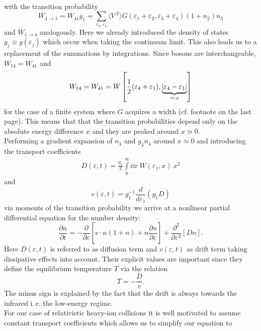 with the transition probability
\begin{equation}
W_{4\rightarrow 1}=  W_{41}g_1 = \sum_{\varepsilon_2, \varepsilon_3} \langle V^{\phantom{.}2}\rangle G(\varepsilon_1+\varepsilon_2,\varepsilon_3+\varepsilon_4)(1+n_2)n_3
\end{equation}
and $W_{1\rightarrow 4}$ analogously. Here we already introduced the density of states $g_j\equiv g(\varepsilon_j)$ which occur when taking the continuum limit. This also leads us to a replacement of the summations by integrations. Since bosons are interchangeable, $W_{14}=W_{41}$ and 
\begin{equation}
		W_{14}=W_{41}=W\left[\frac{1}{2}(\varepsilon_4+\varepsilon_1),\underbrace{\abs{\varepsilon_4-\varepsilon_1}}_{=: x}\right]
	\end{equation}
for the case of a finite system where $G$ acquires a width (cf. footnote on the last page). This means that that the transition probabilities depend only on the absolute energy difference $x$ and they are peaked around $x\simeq 0$.\\
\noindent
Performing a gradient expansion of $n_4$ and $g_4n_4$ around $x\simeq 0$ and introducing the transport coefficients
\begin{align}
	D(\varepsilon,t) = \frac{g_1}{2}\int\limits_0^{\infty}\dd x\ W(\varepsilon_1,x) \ x^2
\end{align}
and 
\begin{equation}
		v(\varepsilon,t) = g_1^{-1}\frac{d}{d\varepsilon_1}(g_1D) 
\end{equation}
via moments of the transition probability we arrive at a nonlinear partial differential equation for the number density:
\begin{equation}
			\frac{\partial n}{\partial t} = -\frac{\partial}{\partial\varepsilon}\left[v\cdot n(1+n) + n\frac{\partial n}{\partial\varepsilon}\right] + \frac{\partial^2}{\partial\varepsilon^2}\left[Dn\right]\label{eqn:nbde1}.
\end{equation}
Here $D(\varepsilon,t)$ is referred to as diffusion term and $v(\varepsilon,t)$ as drift term taking dissipative effects into account. Their explicit values are important since they define the equilibrium temperature $T$ via the relation
\begin{equation}
	T = -\frac{D}{v}.
\end{equation}
The minus sign is explained by the fact that the drift is always towards the infrared i.\,e. the low-energy regime.\\
 For our case of relativistic heavy-ion collisions it is well motivated to assume constant transport coefficients which allows us to simplify our equation to
